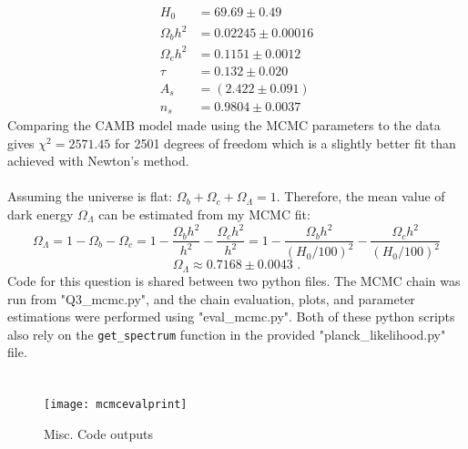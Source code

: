 \documentclass{article}
\newcommand{\<}[1]{\left\langle #1 \right\rangle }
\begin{document}
\begin{align*}
	H_0 &= 69.69 \pm 0.49  \\
	\Omega_b h^2 &= 0.02245 \pm 0.00016 \\
	\Omega_c h^2 &= 0.1151 \pm 0.0012 \\
	\tau &= 0.132 \pm 0.020 \\
	A_s &=  (2.422 \pm 0.091)\\
	n_s &=  0.9804 \pm 0.0037
\end{align*}
Comparing the CAMB model made using the MCMC parameters to the data gives $\chi^2 = 2571.45$ for 2501 degrees of freedom which is a slightly better fit than achieved with Newton's method.\\
\\
Assuming the universe is flat: $\Omega_b + \Omega_c + \Omega_\Lambda=1$. Therefore, the mean value of dark energy $\Omega_\Lambda$ can be estimated from my MCMC fit:
\[\Omega_\Lambda = 1 - \Omega_b - \Omega_c = 1 - \frac{\Omega_b h^2}{h^2} - \frac{\Omega_c h^2}{h^2} = 1 - \frac{\Omega_b h^2}{(H_0/100)^2} - \frac{\Omega_c h^2}{(H_0/100)^2} \]
\[\Omega_\Lambda \approx 0.7168 \pm 0.0043 \text{ .}\]
Code for this question is shared between two python files. The MCMC chain was run from "Q3\_mcmc.py", and the chain evaluation, plots, and parameter estimations were performed using "eval\_mcmc.py". Both of these python scripts also rely on the \texttt{get\_spectrum} function in the provided "planck\_likelihood.py" file.

\section{}



\begin{figure}[h]
	\caption{Misc. Code outputs}
	\centering
	\texttt{[image: mcmcevalprint]}
\end{figure}


	
\end{document}
